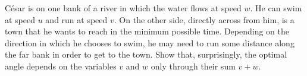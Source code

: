 C\'esar is on one bank of a river in which the water flows at speed $w$.
He can swim at speed $u$ and run at speed $v$. On the other side, directly
across from him, is a town that he wants to reach in the minimum possible
time. Depending on the direction in which he chooses to swim, he may need
to run some distance along the far bank in order to get to the town.
Show that, surprisingly, the optimal angle depends on the variables $v$ and $w$ only
through their sum $v+w$.
